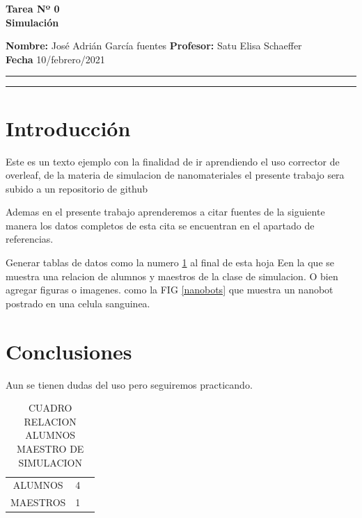 \documentclass[a4paper, 11pt]{article}
\begin{document}
\begin{center}
\LARGE \bf Tarea Nº 0\\ Simulaci\'on
\end{center}

\bigskip

\hfill\textbf{Nombre:} José Adrián García fuentes\hfill
\hfill\textbf{Profesor:} Satu Elisa Schaeffer\hfill \\
\textbf{Fecha} 10/febrero/2021\\

\hrule

\bigskip
\begin{abstract}
Simple demo explicando uso basico de \LaTeX{} en overleaf.
    
\end{abstract}
\hrule

\section{Introducción}

\medskip

\bigskip

 {Este es un texto ejemplo con la finalidad de ir aprendiendo el uso corrector de overleaf, de la materia de simulacion de nanomateriales el presente trabajo sera subido a un repositorio de github}
 
\vspace{1cm}

Ademas en el presente trabajo aprenderemos a citar fuentes de la siguiente manera \citep{ejemplo} los datos completos de esta cita se encuentran en el apartado de referencias.
\vspace{1cm}

Generar tablas de datos como la numero \ref{datos} al final de esta hoja Een la que se muestra una relacion  de alumnos y maestros de la clase de simulacion. O bien agregar figuras o imagenes. como la FIG \ref{nanobots} que muestra un nanobot postrado en una celula sanguinea.

\section{Conclusiones}
Aun se tienen dudas del uso pero seguiremos practicando.

\begin{table}[b]
    \caption{CUADRO RELACION ALUMNOS MAESTRO DE SIMULACION}
    \label{datos}
    \centering
    \begin{tabular}{c|cr}
    ALUMNOS     &  4\\
    MAESTROS     &  1
    \end{tabular}
\end{table}
\end{document}
